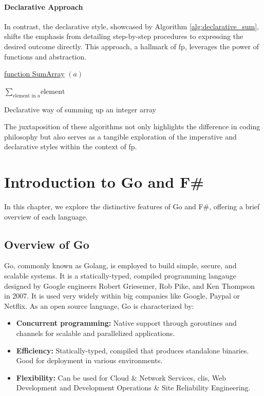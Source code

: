 \subsubsection{Declarative Approach}

In contrast, the declarative style, showcased by Algorithm \ref{alg:declarative_sum}, shifts the emphasis from detailing step-by-step procedures to expressing the desired outcome directly. This approach, a hallmark of \ac{fp}, leverages the power of functions and abstraction.

\begin{algorithm}

    \underline{function SumArray} $(a)$\;
    
    \BlankLine
    \Return $\sum_{\text{element in } a} \text{element}$
    
    \caption{Declarative way of summing up an integer array}
    \label{alg:declarative_sum}
\end{algorithm}

The juxtaposition of these algorithms not only highlights the difference in coding philosophy but also serves as a tangible exploration of the imperative and declarative styles within the context of \ac{fp}.


\chapter{Introduction to Go and F\#}\label{chap:language-comparison}
In this chapter, we explore the distinctive features of Go and F\#, offering a brief overview of each language.

    \section{Overview of Go}\label{sec:go-overview}
    Go, commonly known as Golang, is employed to build simple, secure, and scalable systems. It is a statically-typed, compiled programming langauge designed by Google engineers Robert Griesemer, Rob Pike, and Ken Thompson in 2007. It is used very widely within big companies like Google, Paypal or Netflix. As an open source language, Go is characterized by: 
    \begin{itemize}
        \item \textbf{Concurrent programming:}  Native support through goroutines and channels for scalable and parallelized applications.
        \item \textbf{Efficiency:} Statically-typed, compiled that produces standalone binaries. Good for deployment in various environments.
        \item \textbf{Flexibility:} Can be used for Cloud \& Network Services, \ac{cli}s, Web Development and Development Operations \& Site Reliability Engineering.
    \end{itemize}
    \cite{GoWebsite}

